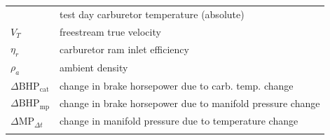 \documentclass[
]{book}
\begin{document}
\begin{longtable}[]{@{}ll@{}}
\begin{minipage}[t]{0.13\columnwidth}
\end{minipage} & \begin{minipage}[t]{0.81\columnwidth}\raggedright
test day carburetor temperature (absolute)\strut
\end{minipage}\tabularnewline
\begin{minipage}[t]{0.13\columnwidth}\raggedright
\(V_T\)\strut
\end{minipage} & \begin{minipage}[t]{0.81\columnwidth}\raggedright
freestream true velocity\strut
\end{minipage}\tabularnewline
\begin{minipage}[t]{0.13\columnwidth}\raggedright
\(\eta_r\)\strut
\end{minipage} & \begin{minipage}[t]{0.81\columnwidth}\raggedright
carburetor ram inlet efficiency\strut
\end{minipage}\tabularnewline
\begin{minipage}[t]{0.13\columnwidth}\raggedright
\(\rho_a\)\strut
\end{minipage} & \begin{minipage}[t]{0.81\columnwidth}\raggedright
ambient density\strut
\end{minipage}\tabularnewline
\begin{minipage}[t]{0.13\columnwidth}\raggedright
\(\Delta \mathrm{BHP}_{\text{cat}}\)\strut
\end{minipage} & \begin{minipage}[t]{0.81\columnwidth}\raggedright
change in brake horsepower due to carb. temp. change\strut
\end{minipage}\tabularnewline
\begin{minipage}[t]{0.13\columnwidth}\raggedright
\(\Delta \mathrm{BHP}_{\text{mp}}\)\strut
\end{minipage} & \begin{minipage}[t]{0.81\columnwidth}\raggedright
change in brake horsepower due to manifold pressure change\strut
\end{minipage}\tabularnewline
\begin{minipage}[t]{0.13\columnwidth}\raggedright
\(\Delta \mathrm{MP}_{\Delta t}\)\strut
\end{minipage} & \begin{minipage}[t]{0.81\columnwidth}\raggedright
change in manifold pressure due to temperature change\strut
\end{minipage}\tabularnewline
\begin{minipage}[t]{0.13\columnwidth}\raggedright

\end{minipage}
\end{longtable}
\end{document}
